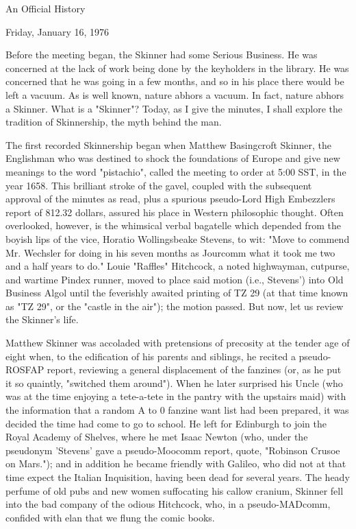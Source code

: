 \documentclass[12pt]{article}
\begin{document}
\begin{center}

An Official History

Friday, January 16, 1976

\end{center}
 
\vspace{12pt}

\setlength{\parskip}{6pt}

\noindent
Before the meeting began, the Skinner had some Serious Business. He was concerned at the lack of work being done by the keyholders in the library. He was concerned that he was going in a few months, and so in his place there would be left a vacuum. As is well known, nature abhors a vacuum. In fact, nature abhors a Skinner. What is a "Skinner"? Today, as I give the minutes, I shall explore the tradition of Skinnership, the myth behind the man.

The first recorded Skinnership began when Matthew Basingcroft Skinner, the Englishman who was destined to shock the foundations of Europe and give new meanings to the word "pistachio", called the meeting to order at 5:00 SST, in the year 1658. This brilliant stroke of the gavel, coupled with the subsequent approval of the minutes as read, plus a spurious pseudo-Lord High Embezzlers report of 812.32 dollars, assured his place in Western philosophic thought. Often overlooked, however, is the whimsical verbal bagatelle which depended from the boyish lips of the vice, Horatio Wollingsbeake Stevens, to wit: "Move to commend Mr. Wechsler for doing in his seven months as Jourcomm what it took me two and a half years to do." Louie "Raffles" Hitchcock, a noted highwayman, cutpurse, and wartime Pindex runner, moved to place said motion (i.e., Stevens') into Old Business Algol until the feverishly awaited printing of TZ 29 (at that time known as "TZ 29", or the "castle in the air"); the motion passed. But now, let us review the Skinner's life.

Matthew Skinner was accoladed with pretensions of precosity at the tender age of eight when, to the edification of his parents and siblings, he recited a pseudo-ROSFAP report, reviewing a general displacement of the fanzines (or, as he put it so quaintly, "switched them around"). When he later surprised his Uncle (who was at the time enjoying a tete-a-tete in the pantry with the upstairs maid) with the information that a random A to 0 fanzine want list had been prepared, it was decided the time had come to go to school. He left for Edinburgh to join the Royal Academy of Shelves, where he met Isaac Newton (who, under the pseudonym 'Stevens' gave a pseudo-Moocomm report, quote, "Robinson Crusoe on Mars."); and in addition he became friendly with Galileo, who did not at that time expect the Italian Inquisition, having been dead for several years. The heady perfume of old pubs and new women suffocating his callow cranium, Skinner fell into the bad company of the odious Hitchcock, who, in a pseudo-MADcomm, confided with elan that we flung the comic books.
\end{document}
